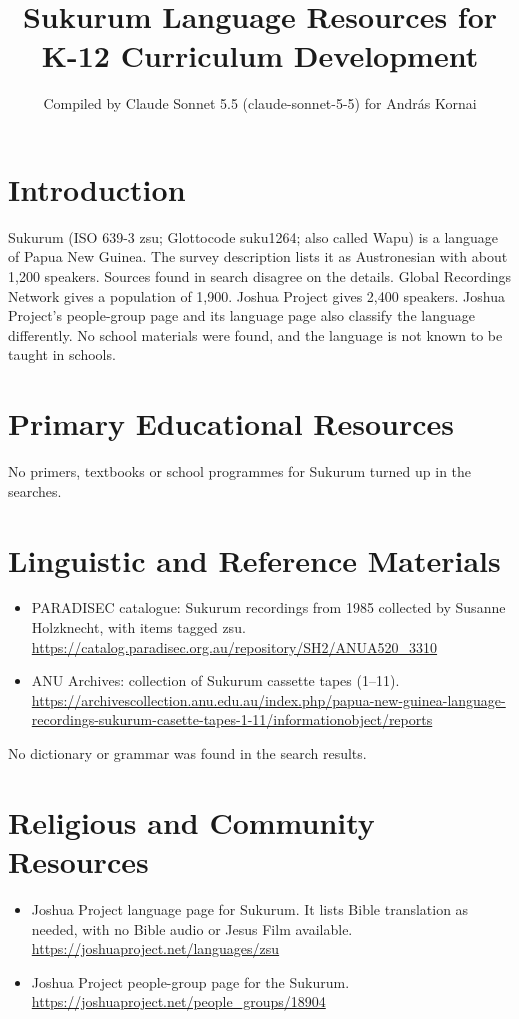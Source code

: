 \documentclass[12pt]{article}
\title{Sukurum Language Resources for K-12 Curriculum Development}
\author{Compiled by Claude Sonnet 5.5 (claude-sonnet-5-5) for Andr\'as Kornai}
\date{}
\begin{document}
\maketitle

\section{Introduction}
Sukurum (ISO 639-3 zsu; Glottocode suku1264; also called Wapu) is a language of Papua New Guinea. The survey description lists it as Austronesian with about 1,200 speakers. Sources found in search disagree on the details. Global Recordings Network gives a population of 1,900. Joshua Project gives 2,400 speakers. Joshua Project's people-group page and its language page also classify the language differently. No school materials were found, and the language is not known to be taught in schools.

\section{Primary Educational Resources}
No primers, textbooks or school programmes for Sukurum turned up in the searches.

\section{Linguistic and Reference Materials}
\begin{itemize}
\item PARADISEC catalogue: Sukurum recordings from 1985 collected by Susanne Holzknecht, with items tagged zsu. \url{https://catalog.paradisec.org.au/repository/SH2/ANUA520_3310}
\item ANU Archives: collection of Sukurum cassette tapes (1--11). \url{https://archivescollection.anu.edu.au/index.php/papua-new-guinea-language-recordings-sukurum-casette-tapes-1-11/informationobject/reports}
\end{itemize}
No dictionary or grammar was found in the search results.

\section{Religious and Community Resources}
\begin{itemize}
\item Joshua Project language page for Sukurum. It lists Bible translation as needed, with no Bible audio or Jesus Film available. \url{https://joshuaproject.net/languages/zsu}
\item Joshua Project people-group page for the Sukurum. \url{https://joshuaproject.net/people_groups/18904}
\end{itemize}
\end{document}
